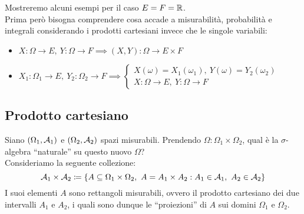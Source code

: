 \smallskip
Mostreremo alcuni esempi per il caso $E=F=\mathbb R$.\\
Prima però bisogna comprendere cosa accade a misurabilità, probabilità e integrali considerando i prodotti cartesiani invece che le singole variabili:
\begin{itemize}
  \item $X: \Omega \to E, \ Y: \Omega \to F \implies (X,Y): \Omega \to E\times F$
  \item $X_1:\Omega_1 \to E, \ Y_2:\Omega_2 \to F \implies
  \begin{cases}
      X(\omega)=X_1(\omega_1), \ Y(\omega)=Y_2(\omega_2) \\
      X: \Omega \to E, \ Y: \Omega \to F
  \end{cases}$
\end{itemize}

\subsection{Prodotto cartesiano}
Siano $(\Omega_1 , \mathcal A_1)$ e $(\Omega_2, \mathcal A_2)$ spazi misurabili. Prendendo $\Omega: \Omega_1 \times \Omega_2$, qual è la $\sigma$-algebra ``naturale'' su questo nuovo $\Omega$? \\
Consideriamo la seguente collezione:
 $$\Ac_1 \times \Ac_2 \coloneqq \left \{A \subseteq \Omega_1\times\Omega_2, \ A=A_1 \times A_2: A_1 \in \Ac_1, \ A_2 \in \Ac_2 \right \}$$
 I suoi elementi $A$ sono rettangoli misurabili, ovvero il prodotto cartesiano dei due intervalli $A_1$ e $A_2$, i quali sono dunque le ``proiezioni'' di $A$ sui domini $\Omega_1$ e $\Omega_2$.\\[-10pt]

